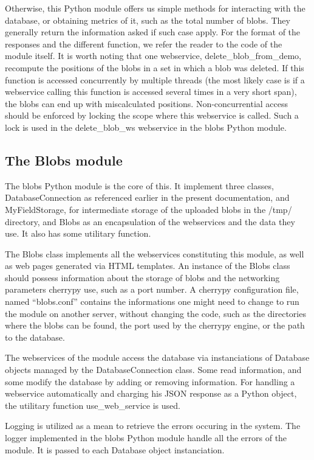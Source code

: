 Otherwise, this Python module offers us simple methods for interacting with the database, or obtaining metrics of it, such as the total number of blobs. They generally return the information asked if such case apply. For the format of the responses and the different function, we refer the reader to the code of the module itself. It is worth noting that one webservice, delete\_blob\_from\_demo, recompute the positions of the blobs in a set in which a blob was deleted. If this function is accessed concurrently by multiple threads (the most likely case is if a webservice calling this function is accessed several times in a very short span), the blobs can end up with miscalculated positions. Non-concurrential access should be enforced by locking the scope where this webservice is called. Such a lock is used in the delete\_blob\_ws webservice in the blobs Python module.

\subsection{The Blobs module}
The blobs Python module is the core of this. It implement three classes, DatabaseConnection as referenced earlier in the present documentation, and MyFieldStorage, for intermediate storage of the uploaded blobs in the /tmp/ directory, and Blobs as an encapsulation of the webservices and the data they use. It also has some utilitary function.

The Blobs class implements all the webservices constituting this module, as well as web pages generated via HTML templates. An instance of the Blobs class should possess information about the storage of blobs and the networking parameters cherrypy use, such as a port number. A cherrypy configuration file, named ``blobs.conf'' contains the informations one might need to change to run the module on another server, without changing the code, such as the directories where the blobs can be found, the port used by the cherrypy engine, or the path to the database.

The webservices of the module access the database via instanciations of Database objects managed by the DatabaseConnection class. Some read information, and some modify the database by adding or removing information. For handling a webservice automatically and charging his JSON response as a Python object, the utilitary function use\_web\_service is used.

Logging is utilized as a mean to retrieve the errors occuring in the system. The logger implemented in the blobs Python module handle all the errors of the module. It is passed to each Database object instanciation.

